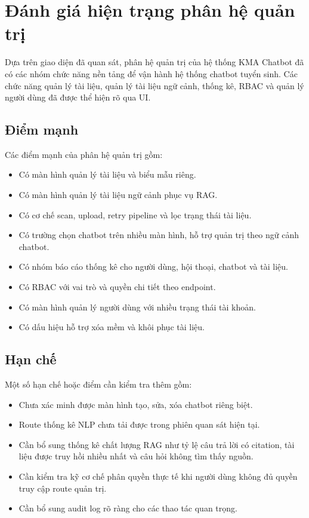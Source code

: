 \section{Đánh giá hiện trạng phân hệ quản trị}

Dựa trên giao diện đã quan sát, phân hệ quản trị của hệ thống KMA Chatbot đã có các nhóm chức năng nền tảng để vận hành hệ thống chatbot tuyển sinh. Các chức năng quản lý tài liệu, quản lý tài liệu ngữ cảnh, thống kê, RBAC và quản lý người dùng đã được thể hiện rõ qua UI.

\subsection{Điểm mạnh}

Các điểm mạnh của phân hệ quản trị gồm:

\begin{itemize}
    \item Có màn hình quản lý tài liệu và biểu mẫu riêng.
    \item Có màn hình quản lý tài liệu ngữ cảnh phục vụ RAG.
    \item Có cơ chế scan, upload, retry pipeline và lọc trạng thái tài liệu.
    \item Có trường chọn chatbot trên nhiều màn hình, hỗ trợ quản trị theo ngữ cảnh chatbot.
    \item Có nhóm báo cáo thống kê cho người dùng, hội thoại, chatbot và tài liệu.
    \item Có RBAC với vai trò và quyền chi tiết theo endpoint.
    \item Có màn hình quản lý người dùng với nhiều trạng thái tài khoản.
    \item Có dấu hiệu hỗ trợ xóa mềm và khôi phục tài liệu.
\end{itemize}

\subsection{Hạn chế}

Một số hạn chế hoặc điểm cần kiểm tra thêm gồm:

\begin{itemize}
    \item Chưa xác minh được màn hình tạo, sửa, xóa chatbot riêng biệt.
    \item Route thống kê NLP chưa tải được trong phiên quan sát hiện tại.
    \item Cần bổ sung thống kê chất lượng RAG như tỷ lệ câu trả lời có citation, tài liệu được truy hồi nhiều nhất và câu hỏi không tìm thấy nguồn.
    \item Cần kiểm tra kỹ cơ chế phân quyền thực tế khi người dùng không đủ quyền truy cập route quản trị.
    \item Cần bổ sung audit log rõ ràng cho các thao tác quan trọng.
\end{itemize}
